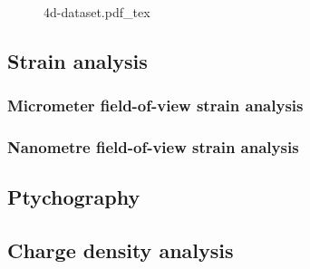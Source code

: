 \begin{figure}[h]
	\centering
	\def\svgwidth{1\linewidth}
	{4d-dataset.pdf_tex}
	\caption{}
	\label{fig:4d_dataset}
\end{figure}

\subsection{Strain analysis}
\subsubsection{Micrometer field-of-view strain analysis}
\subsubsection{Nanometre field-of-view strain analysis}

\subsection{Ptychography}

\subsection{Charge density analysis}




